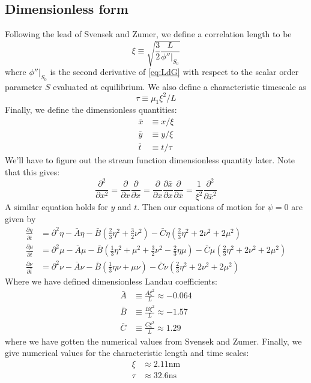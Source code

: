 \documentclass[reqno]{article}
\begin{document}
	\subsection{Dimensionless form}
	Following the lead of Svensek and Zumer, we define a correlation length to be
	\begin{equation}
		\xi \equiv \sqrt{\frac32 \frac{L}{\left.\phi''\right|_{S_0}}}
	\end{equation}
	where $\left.\phi''\right|_{S_0}$ is the second derivative of \eqref{eq:LdG} with respect to the scalar order parameter $S$ evaluated at equilibrium. We also define a characteristic timescale as
	\begin{equation}
		\tau \equiv \mu_1 \xi^2/L
	\end{equation}
	Finally, we define the dimensionless quantities:
	\begin{align}
		\bar{x} &\equiv x/\xi \\
		\bar{y} &\equiv y/\xi \\
		\bar{t} &\equiv t/\tau 
	\end{align}
	We'll have to figure out the stream function dimensionless quantity later. Note that this gives:
	\begin{equation}
		\frac{\partial^2}{\partial x^2} = \frac{\partial}{\partial x}\frac{\partial}{\partial x} = \frac{\partial}{\partial x} \frac{\partial \bar{x}}{\partial x} \frac{\partial}{\partial \bar{x}} = \frac{1}{\xi^2}\frac{\partial^2}{\partial \bar{x}^2}
	\end{equation}
	A similar equation holds for $y$ and $t$. Then our equations of motion for $\psi = 0$ are given by
	\begin{align}
		\frac{\partial \eta}{\partial \bar{t}} &= \partial^2 \eta - \bar{A}\eta - \bar{B}\left( \tfrac 23 \eta^2 + \tfrac 32 \nu^2\right) - \bar{C} \eta \left( \tfrac23 \eta^2 + 2\nu^2 + 2\mu^2\right) \\
		\frac{\partial \mu}{\partial \bar{t}} &= \partial^2 \mu - \bar{A}\mu - \bar{B}\left( \tfrac13 \eta^2 + \mu^2 + \tfrac32 \nu^2 - \tfrac23 \eta \mu \right) - \bar{C}\mu\left(\tfrac23 \eta^2 + 2\nu^2 + 2\mu^2\right) \\
		\frac{\partial \nu}{\partial \bar{t}} &= \partial^2 \nu - \bar{A}\nu - \bar{B}\left( \tfrac13\eta\nu + \mu\nu \right) - \bar{C}\nu\left(\tfrac23\eta^2 + 2\nu^2 + 2\mu^2\right)
	\end{align}
	Where we have defined dimensionless Landau coefficients:
	\begin{align}
		\bar{A} &\equiv \frac{A \xi^2}{L} \approx -0.064 \\
		\bar{B} &\equiv \frac{B \xi^2}{L} \approx -1.57 \\
		\bar{C} &\equiv \frac{C \xi^2}{L} \approx 1.29
	\end{align}
	where we have gotten the numerical values from Svensek and Zumer. Finally, we give numerical values for the characteristic length and time scales:
	\begin{align}
		\xi &\approx 2.11\text{nm} \\
		\tau &\approx 32.6\text{ns}
	\end{align}
	
\end{document}
